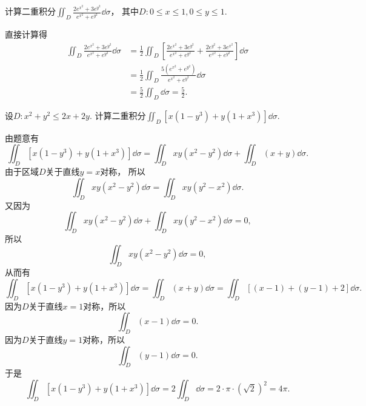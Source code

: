 \begin{example}
计算二重积分\(\iint_D \frac{2 e^{x^2} + 3 e^{y^2}}{e^{x^2} + e^{y^2}} \dd\sigma\)，
其中\(D: 0 \leq x \leq 1, 0 \leq y \leq 1\).
\begin{solution}
直接计算得\begin{align*}
	\iint_D \frac{2 e^{x^2} + 3 e^{y^2}}{e^{x^2} + e^{y^2}} \dd\sigma
	&= \frac12 \iint_D \left[
		\frac{2 e^{x^2} + 3 e^{y^2}}{e^{x^2} + e^{y^2}}
		+ \frac{2 e^{y^2} + 3 e^{x^2}}{e^{x^2} + e^{y^2}}
	\right] \dd\sigma \\
	&= \frac12 \iint_D \frac{5 (e^{x^2} + e^{y^2})}{e^{x^2} + e^{y^2}} \dd\sigma \\
	&= \frac52 \iint_D \dd\sigma
	= \frac52.
\end{align*}
\end{solution}
\end{example}

\begin{example}
设\(D: x^2+y^2\leq2x+2y\).
计算二重积分\(\iint_D [x(1-y^3)+y(1+x^3)] \dd\sigma\).
\begin{solution}
由题意有\[
	\iint_D [x(1-y^3)+y(1+x^3)] \dd\sigma
	= \iint_D xy(x^2-y^2) \dd\sigma
	+ \iint_D (x+y) \dd\sigma.
\]
由于区域\(D\)关于直线\(y=x\)对称，
所以\[
	\iint_D xy(x^2-y^2) \dd\sigma
	= \iint_D xy(y^2-x^2) \dd\sigma.
\]
又因为\[
	\iint_D xy(x^2-y^2) \dd\sigma
	+ \iint_D xy(y^2-x^2) \dd\sigma
	= 0,
\]
所以\[
	\iint_D xy(x^2-y^2) \dd\sigma
	= 0,
\]
从而有\[
	\iint_D [x(1-y^3)+y(1+x^3)] \dd\sigma
	= \iint_D (x+y) \dd\sigma
	= \iint_D [(x-1)+(y-1)+2] \dd\sigma.
\]
因为\(D\)关于直线\(x=1\)对称，所以\[
	\iint_D (x-1) \dd\sigma
	= 0.
\]
因为\(D\)关于直线\(y=1\)对称，所以\[
	\iint_D (y-1) \dd\sigma
	= 0.
\]
于是\[
	\iint_D [x(1-y^3)+y(1+x^3)] \dd\sigma
	= 2 \iint_D \dd\sigma
	= 2 \cdot \pi \cdot (\sqrt2)^2
	= 4\pi.
\]
\end{solution}
\end{example}
